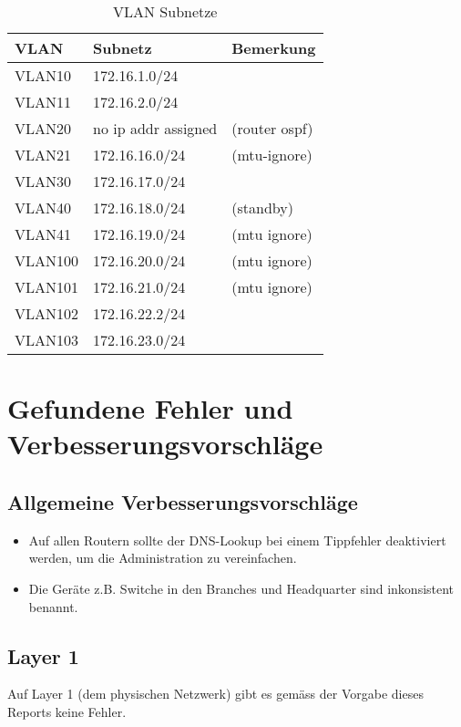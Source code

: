 \begin{table}[h]
	\centering
	\begin{tabu} to \linewidth {l l l}
		\toprule 
		VLAN & Subnetz & Bemerkung \\
		\midrule
		VLAN10 & 172.16.1.0/24 & \\
		VLAN11 & 172.16.2.0/24 & \\
		VLAN20 & no ip addr assigned & (router ospf) \\
		VLAN21 & 172.16.16.0/24 & (mtu-ignore) \\
		VLAN30 & 172.16.17.0/24 & \\
		VLAN40 & 172.16.18.0/24 & (standby) \\
		VLAN41 & 172.16.19.0/24 & (mtu ignore) \\
		VLAN100 & 172.16.20.0/24 & (mtu ignore) \\
		VLAN101 & 172.16.21.0/24 & (mtu ignore) \\
		VLAN102 & 172.16.22.2/24 & \\
		VLAN103 & 172.16.23.0/24 & \\
		\bottomrule 
	\end{tabu} 
	\caption{VLAN Subnetze}
\end{table}




\section{Gefundene Fehler und Verbesserungsvorschläge}


\subsection{Allgemeine Verbesserungsvorschläge}

\begin{itemize}
	\item Auf allen Routern sollte der DNS-Lookup bei einem Tippfehler deaktiviert werden, um die Administration zu vereinfachen.
	\item Die Geräte z.B. Switche in den Branches und Headquarter sind inkonsistent benannt.
\end{itemize}

\subsection{Layer 1}
Auf Layer 1 (dem physischen Netzwerk) gibt es gemäss der Vorgabe dieses Reports keine Fehler.

